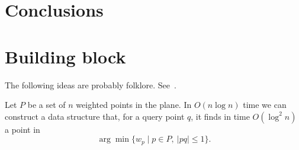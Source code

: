 \documentclass[a4paper,USenglish,numberwithinsect]{lipics}
\let\le\leqslant
\begin{document}
\section{Conclusions}
\label{sec:conclusions}





\section{Building block}

The following ideas are probably folklore. See~\cite{aa}.

\begin{lemma}
\label{le:ds2}
	Let $P$ be a set of $n$ weighted points in the plane.
	In $O(n\log n)$ time we can construct a data structure that,
	for a query point $q$, it finds in time $O(\log^2 n)$ a point in
	\[	\arg\min \{ w_p \mid p\in P,~|pq|\le 1\}.
	\]
\end{lemma}
\end{document}

